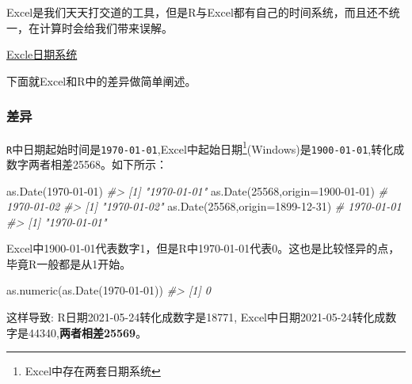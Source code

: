 \documentclass[
]{book}
\newenvironment{Shaded}{\begin{snugshade}}{\end{snugshade}}
\newcommand{\AttributeTok}[1]{\textcolor[rgb]{0.77,0.63,0.00}{#1}}
\newcommand{\CommentTok}[1]{\textcolor[rgb]{0.56,0.35,0.01}{\textit{#1}}}
\newcommand{\DecValTok}[1]{\textcolor[rgb]{0.00,0.00,0.81}{#1}}
\newcommand{\FunctionTok}[1]{\textcolor[rgb]{0.00,0.00,0.00}{#1}}
\newcommand{\NormalTok}[1]{#1}
\newcommand{\StringTok}[1]{\textcolor[rgb]{0.31,0.60,0.02}{#1}}
\begin{document}
Excel是我们天天打交道的工具，但是R与Excel都有自己的时间系统，而且还不统一，在计算时会给我们带来误解。

\href{https://support.microsoft.com/zh-cn/office/excel-\%e4\%b8\%ad\%e7\%9a\%84\%e6\%97\%a5\%e6\%9c\%9f\%e7\%b3\%bb\%e7\%bb\%9f-e7fe7167-48a9-4b96-bb53-5612a800b487?ui=zh-CN\&rs=zh-CN\&ad=CN}{Excle日期系统}

下面就Excel和R中的差异做简单阐述。

\hypertarget{ux5deeux5f02}{%
\subsubsection{差异}\label{ux5deeux5f02}}

\texttt{R}中日期起始时间是\texttt{1970-01-01},Excel中起始日期\footnote{Excel中存在两套日期系统}(Windows)是\texttt{1900-01-01},转化成数字两者相差25568。如下所示：

\begin{Shaded}
\begin{Highlighting}[]
\FunctionTok{as.Date}\NormalTok{(}\StringTok{\textquotesingle{}1970{-}01{-}01\textquotesingle{}}\NormalTok{)}
\CommentTok{\#\textgreater{} [1] "1970{-}01{-}01"}
\FunctionTok{as.Date}\NormalTok{(}\DecValTok{25568}\NormalTok{,}\AttributeTok{origin=}\StringTok{\textquotesingle{}1900{-}01{-}01\textquotesingle{}}\NormalTok{) }\CommentTok{\# 1970{-}01{-}02}
\CommentTok{\#\textgreater{} [1] "1970{-}01{-}02"}
\FunctionTok{as.Date}\NormalTok{(}\DecValTok{25568}\NormalTok{,}\AttributeTok{origin=}\StringTok{\textquotesingle{}1899{-}12{-}31\textquotesingle{}}\NormalTok{) }\CommentTok{\# 1970{-}01{-}01}
\CommentTok{\#\textgreater{} [1] "1970{-}01{-}01"}
\end{Highlighting}
\end{Shaded}

Excel中1900-01-01代表数字1，但是R中1970-01-01代表0。这也是比较怪异的点，毕竟R一般都是从1开始。

\begin{Shaded}
\begin{Highlighting}[]
\FunctionTok{as.numeric}\NormalTok{(}\FunctionTok{as.Date}\NormalTok{(}\StringTok{\textquotesingle{}1970{-}01{-}01\textquotesingle{}}\NormalTok{))}
\CommentTok{\#\textgreater{} [1] 0}
\end{Highlighting}
\end{Shaded}

这样导致:
R日期2021-05-24转化成数字是18771,
Excel中日期2021-05-24转化成数字是44340,\textbf{两者相差25569}。
\end{document}
